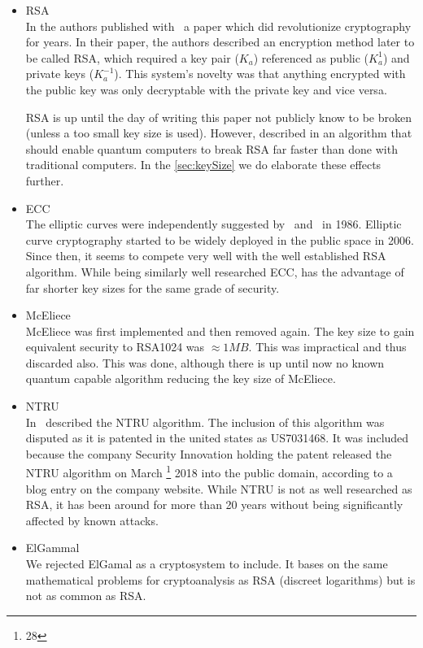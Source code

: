 \begin{itemize}
	\item RSA\\
	In \citeyear{Rivest:1978:MOD:359340.359342} the authors \citeauthor{Rivest:1978:MOD:359340.359342} published with~\cite{Rivest:1978:MOD:359340.359342} a paper which did revolutionize cryptography for years. In their paper, the authors described an encryption method later to be called RSA, which required a key pair ($K_a$) referenced as public ($K^{1}_a$) and private keys ($K^{-1}_a$). This system's novelty was that anything encrypted with the public key was only decryptable with the private key and vice versa.
	
	RSA is up until the day of writing this paper not publicly know to be broken (unless a too small key size is used). However, \citeauthor{Shor97polynomial-timealgorithms} described in \citeyear{Shor97polynomial-timealgorithms} an algorithm that should enable quantum computers to break RSA far faster than done with traditional computers. In the \cref{sec:keySize} we do elaborate these effects further.
	\item ECC\\
	The elliptic curves were independently suggested by~\cite{Miller1986} and~\cite{Koblitz04guideto} in 1986. Elliptic curve cryptography started to be widely deployed in the public space in 2006. Since then, it seems to compete very well with the well established RSA algorithm. While being similarly well researched ECC, has the advantage of far shorter key sizes for the same grade of security.
	\item McEliece\\
	McEliece was first implemented and then removed again. The key size to gain equivalent security to RSA1024 was $\approx 1MB$. This was impractical and thus discarded also. This was done, although there is up until now no known quantum capable algorithm reducing the key size of McEliece.
	\item NTRU\\
	In~\cite{Hoffstein1998} \citeauthor{Hoffstein1998} described the NTRU algorithm. The inclusion of this algorithm was disputed as it is patented in the united states as US7031468. It was included because the company Security Innovation holding the patent released the NTRU algorithm on March \thanks{28} 2018 into the public domain, according to a blog entry on the company website. While NTRU is not as well researched as RSA, it has been around for more than 20 years without being significantly affected by known attacks.
	\item ElGammal\\
	We rejected ElGamal as a cryptosystem to include. It bases on the same mathematical problems for cryptoanalysis as RSA (discreet logarithms) but is not as common as RSA.
\end{itemize}



